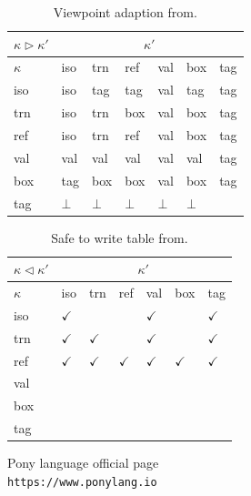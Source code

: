 \documentclass{article}
\begin{document}
\begin{multicols}{2}
\begin{table}[]
\centering
\begin{tabular}{lllllll}
\hline
$\kappa \triangleright \kappa'$ & \multicolumn{6}{c}{$\kappa'$}             \\ \hline
$\kappa$                 & iso & trn & ref & val & box & tag \\ \hline \hline
iso               & iso & tag & tag & val & tag & tag \\ \hline
trn               & iso & trn & box & val & box & tag \\ \hline
ref               & iso & trn & ref & val & box & tag \\ \hline
val               & val & val & val & val & val & tag \\ \hline
box               & tag & box & box & val & box & tag \\ \hline
tag               &  $\bot$ & $\bot$ & $\bot$ & $\bot$ & $\bot$ &     \\ \hline
\end{tabular}
\caption{Viewpoint adaption from\cite{type-proof-paper}.}
\end{table}


\begin{table}[]
\centering
\begin{tabular}{lllllll}
\hline
$\kappa \triangleleft \kappa'$ & \multicolumn{6}{c}{$\kappa'$}             \\ \hline
$\kappa$                 & iso & trn & ref & val & box & tag \\ \hline \hline
iso               & $\checkmark$ &  &  & $\checkmark$ &  & $\checkmark$ \\ \hline
trn               & $\checkmark$ & $\checkmark$ &  & $\checkmark$ &  & $\checkmark$ \\ \hline
ref               & $\checkmark$ & $\checkmark$ & $\checkmark$ & $\checkmark$ & $\checkmark$ & $\checkmark$ \\ \hline
val               &  &  &  &  &  &  \\ \hline
box               &  &  &  &  &  &  \\ \hline
tag               &   &  &  &  &  &     \\ \hline
\end{tabular}
\caption{Safe to write table from\cite{type-proof-paper}.}
\end{table}




\begin{thebibliography}{9}
Pony language official page
\\\texttt{https://www.ponylang.io}


\end{thebibliography}
\end{multicols}
\end{document}
